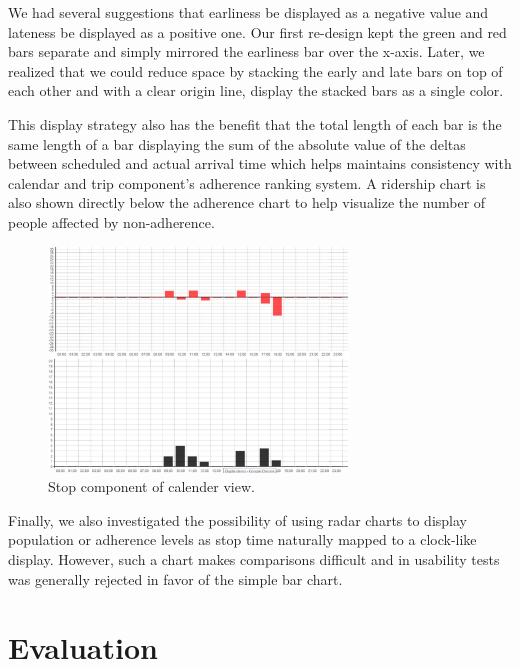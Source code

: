 \documentclass[journal]{vgtc}                %
\begin{document}
We had several suggestions that earliness be displayed as a negative value and lateness be displayed as a positive one. Our first re-design kept the green and red bars separate and simply mirrored the earliness bar over the x-axis. Later, we realized that we could reduce space by stacking the early and late bars on top of each other and with a clear origin line, display the stacked bars as a single color.

This display strategy also has the benefit that the total length of each bar is the same length of a bar displaying the sum of the absolute value of the deltas between scheduled and actual arrival time which helps maintains consistency with calendar and trip component's adherence ranking system. A ridership chart is also shown directly below the adherence chart to help visualize the number of people affected by non-adherence.

\begin{figure}[htb]
 \centering
 \includegraphics[width=8cm]{img/image05}
 \caption{Stop component of calender view.}
 \label{stop_component}
\end{figure}

Finally, we also investigated the possibility of using radar charts to display population or adherence levels as stop time naturally mapped to a clock-like display. However, such a chart makes comparisons difficult and in usability tests was generally rejected in favor of the simple bar chart.

\section{Evaluation}
\end{document}
